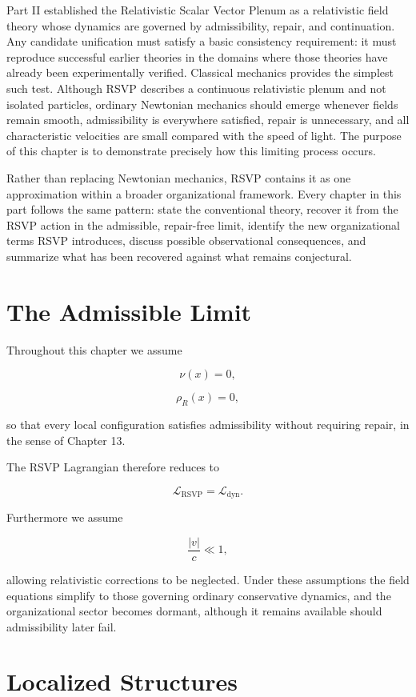 \documentclass[11pt,oneside]{book}
\numberwithin{equation}{chapter}
\theoremstyle{definition}
\theoremstyle{plain}
\begin{document}
Part II established the Relativistic Scalar Vector Plenum as a relativistic field theory whose dynamics are governed by admissibility, repair, and continuation. Any candidate unification must satisfy a basic consistency requirement: it must reproduce successful earlier theories in the domains where those theories have already been experimentally verified. Classical mechanics provides the simplest such test. Although RSVP describes a continuous relativistic plenum and not isolated particles, ordinary Newtonian mechanics should emerge whenever fields remain smooth, admissibility is everywhere satisfied, repair is unnecessary, and all characteristic velocities are small compared with the speed of light. The purpose of this chapter is to demonstrate precisely how this limiting process occurs.

Rather than replacing Newtonian mechanics, RSVP contains it as one approximation within a broader organizational framework. Every chapter in this part follows the same pattern: state the conventional theory, recover it from the RSVP action in the admissible, repair-free limit, identify the new organizational terms RSVP introduces, discuss possible observational consequences, and summarize what has been recovered against what remains conjectural.

\section{The Admissible Limit}

Throughout this chapter we assume

\[
\nu(x)=0,
\]

\[
\rho_R(x)=0,
\]

so that every local configuration satisfies admissibility without requiring
repair, in the sense of Chapter 13.

The RSVP Lagrangian therefore reduces to

\[
\mathcal L_{\mathrm{RSVP}}
=
\mathcal L_{\mathrm{dyn}}.
\]

Furthermore we assume

\[
\frac{|v|}{c}\ll1,
\]

allowing relativistic corrections to be neglected. Under these assumptions the field equations simplify to those governing ordinary conservative dynamics, and the organizational sector becomes dormant, although it remains available should admissibility later fail.

\section{Localized Structures}
\end{document}
